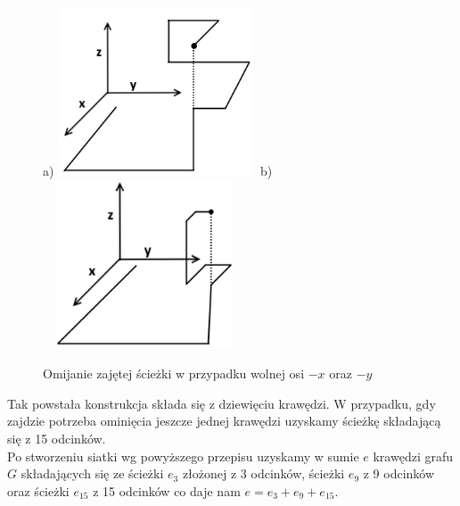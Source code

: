 \documentclass[brudnopis]{xmgr}
\theoremstyle{definition}
\begin{document}
\begin{figure}[ht!]
  \centering
  a)\includegraphics[width=6cm,height=5cm]{rysunki/zajete_z.png}
  b)\includegraphics[width=6cm,height=5cm]{rysunki/zajete_z2.png}
  \caption{Omijanie zajętej ścieżki w przypadku wolnej osi $-x$ oraz $-y$}
  \label{fig:nakladanie}
\end{figure} 
Tak powstała konstrukcja składa się z dziewięciu krawędzi. W przypadku, gdy zajdzie potrzeba ominięcia jeszcze jednej krawędzi uzyskamy ścieżkę składającą się z 15 odcinków.
\\\indent Po stworzeniu siatki wg powyższego przepisu uzyskamy w sumie $e$ krawędzi grafu $G$ składających się ze ścieżki $e_3$ złożonej z 3 odcinków, ścieżki $e_9$ z 9 odcinków oraz ścieżki $e_{15}$ z 15 odcinków co daje nam $e = e_3 + e_9 + e_{15}$.
\end{document}
